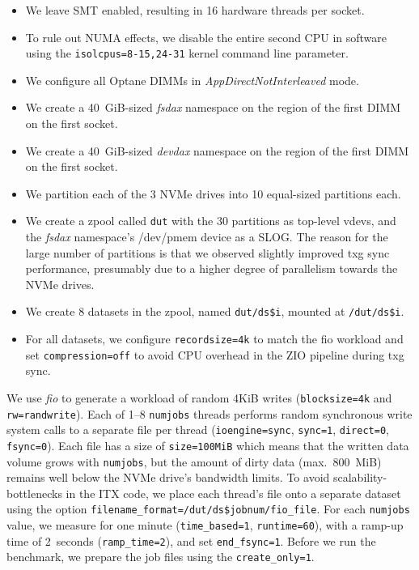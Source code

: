 \documentclass[12pt,a4paper,twoside]{book}
\begin{document}
\begin{itemize}[noitemsep]
    \item We leave SMT enabled, resulting in 16 hardware threads per socket.
    \item To rule out NUMA effects, we disable the entire second CPU in software using the \lstinline{isolcpus=8-15,24-31} kernel command line parameter.
    \item We configure all Optane DIMMs in \textit{AppDirectNotInterleaved} mode.
    \item We create a 40~GiB-sized \textit{fsdax} namespace on the region of the first DIMM on the first socket.
    \item We create a 40~GiB-sized \textit{devdax} namespace on the region of the first DIMM on the first socket.
    \item We partition each of the 3 NVMe drives into 10 equal-sized partitions each.
    \item We create a zpool called \texttt{dut} with the 30 partitions as top-level vdevs, and the \textit{fsdax} namespace's /dev/pmem device as a SLOG.
        The reason for the large number of partitions is that we observed slightly improved txg sync performance, presumably due to a higher degree of parallelism towards the NVMe drives.
    \item We create 8 datasets in the zpool, named \lstinline{dut/ds$i}, mounted at \lstinline{/dut/ds$i}.
    \item For all datasets, we configure \lstinline{recordsize=4k} to match the fio workload and set \lstinline{compression=off} to avoid CPU overhead in the ZIO pipeline during txg sync.
\end{itemize}

We use \textit{fio} to generate a workload of random 4KiB writes (\lstinline{blocksize=4k} and \lstinline{rw=randwrite}).
Each of 1--8 \lstinline{numjobs} threads performs random synchronous write system calls to a separate file per thread (\lstinline{ioengine=sync}, \lstinline{sync=1}, \lstinline{direct=0}, \lstinline{fsync=0}).
Each file has a size of \lstinline{size=100MiB} which means that the written data volume grows with \lstinline{numjobs}, but the amount of dirty data (max.~800~MiB) remains well below the NVMe drive's bandwidth limits.
To avoid scalability-bottlenecks in the ITX code, we place each thread's file onto a separate dataset using the option \lstinline{filename_format=/dut/ds$jobnum/fio_file}.
For each \lstinline{numjobs} value, we measure for one minute (\lstinline{time_based=1}, \lstinline{runtime=60}), with a ramp-up time of 2~seconds (\lstinline{ramp_time=2}), and set \lstinline{end_fsync=1}.
Before we run the benchmark, we prepare the job files using the \lstinline{create_only=1}.
\end{document}
